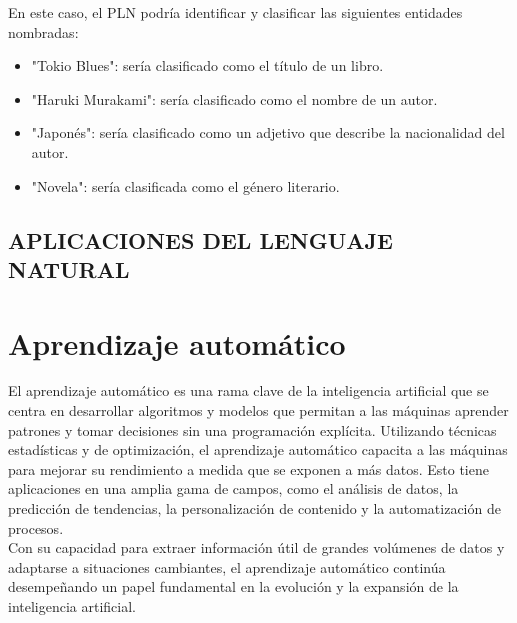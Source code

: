 En este caso, el PLN podría identificar y clasificar las siguientes entidades nombradas:

\begin{itemize}
    \item "Tokio Blues": sería clasificado como el título de un libro.
    \item "Haruki Murakami": sería clasificado como el nombre de un autor.
    \item "Japonés": sería clasificado como un adjetivo que describe la nacionalidad del autor.
    \item "Novela": sería clasificada como el género literario.
\end{itemize}

\subsection{APLICACIONES DEL LENGUAJE NATURAL}

\section{Aprendizaje automático}

El aprendizaje automático es una rama clave de la inteligencia artificial que se centra en desarrollar algoritmos 
y modelos que permitan a las máquinas aprender patrones y tomar decisiones sin una programación explícita. Utilizando 
técnicas estadísticas y de optimización, el aprendizaje automático capacita a las máquinas para mejorar su 
rendimiento a medida que se exponen a más datos. Esto tiene aplicaciones en una amplia gama de campos, como el 
análisis de datos, la predicción de tendencias, la personalización de contenido y la automatización de procesos.\\ 


Con su capacidad para extraer información útil de grandes volúmenes de datos y adaptarse a situaciones cambiantes, 
el aprendizaje automático continúa desempeñando un papel fundamental en la evolución y la expansión de 
la inteligencia artificial.